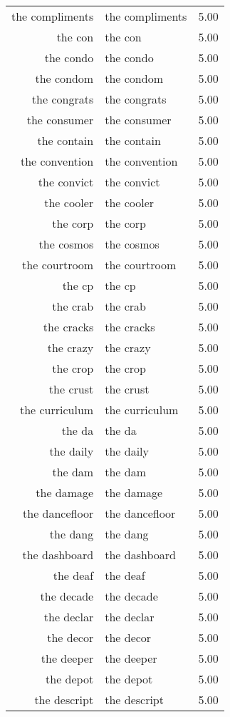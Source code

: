 \begin{table}[ht]
\begin{tabular}{rlr}
  the compliments & the compliments & 5.00 \\ 
  the con & the con & 5.00 \\ 
  the condo & the condo & 5.00 \\ 
  the condom & the condom & 5.00 \\ 
  the congrats & the congrats & 5.00 \\ 
  the consumer & the consumer & 5.00 \\ 
  the contain & the contain & 5.00 \\ 
  the convention & the convention & 5.00 \\ 
  the convict & the convict & 5.00 \\ 
  the cooler & the cooler & 5.00 \\ 
  the corp & the corp & 5.00 \\ 
  the cosmos & the cosmos & 5.00 \\ 
  the courtroom & the courtroom & 5.00 \\ 
  the cp & the cp & 5.00 \\ 
  the crab & the crab & 5.00 \\ 
  the cracks & the cracks & 5.00 \\ 
  the crazy & the crazy & 5.00 \\ 
  the crop & the crop & 5.00 \\ 
  the crust & the crust & 5.00 \\ 
  the curriculum & the curriculum & 5.00 \\ 
  the da & the da & 5.00 \\ 
  the daily & the daily & 5.00 \\ 
  the dam & the dam & 5.00 \\ 
  the damage & the damage & 5.00 \\ 
  the dancefloor & the dancefloor & 5.00 \\ 
  the dang & the dang & 5.00 \\ 
  the dashboard & the dashboard & 5.00 \\ 
  the deaf & the deaf & 5.00 \\ 
  the decade & the decade & 5.00 \\ 
  the declar & the declar & 5.00 \\ 
  the decor & the decor & 5.00 \\ 
  the deeper & the deeper & 5.00 \\ 
  the depot & the depot & 5.00 \\ 
  the descript & the descript & 5.00 \\ 

\end{tabular}
\end{table}
